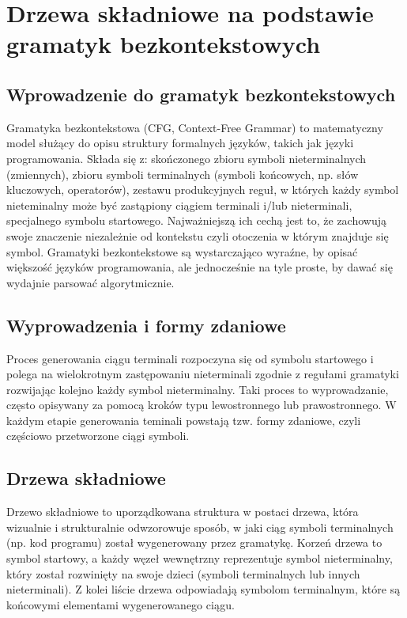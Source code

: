 \documentclass[12pt,twoside]{article}
\begin{document}
\clearpage

\section{Drzewa składniowe na podstawie gramatyk bezkontekstowych}
\subsection{Wprowadzenie do gramatyk bezkontekstowych}
Gramatyka bezkontekstowa (CFG, Context-Free Grammar) to matematyczny model służący do opisu struktury formalnych języków, takich jak języki programowania. Składa się z: skończonego zbioru symboli nieterminalnych (zmiennych), zbioru symboli terminalnych (symboli końcowych, np. słów kluczowych, operatorów), zestawu produkcyjnych reguł, w których każdy symbol nieteminalny może być zastąpiony ciągiem terminali i/lub nieterminali, specjalnego symbolu startowego. Najważniejszą ich cechą jest to, że zachowują swoje znaczenie niezależnie od kontekstu czyli otoczenia w którym znajduje się symbol. Gramatyki bezkontekstowe są wystarczająco wyraźne, by opisać większość języków programowania, ale jednocześnie na tyle proste, by dawać się wydajnie parsować algorytmicznie.\cite{contextFreeGrammar}

\subsection{Wyprowadzenia i formy zdaniowe}
Proces generowania ciągu terminali rozpoczyna się od symbolu startowego i polega na wielokrotnym zastępowaniu nieterminali zgodnie z regułami gramatyki rozwijając kolejno każdy symbol nieterminalny\cite{contextFreeGrammar}. Taki proces to wyprowadzanie, często opisywany za pomocą kroków typu lewostronnego lub prawostronnego. W każdym etapie generowania teminali powstają tzw. formy zdaniowe, czyli częściowo przetworzone ciągi symboli.

\subsection{Drzewa składniowe}
Drzewo składniowe to uporządkowana struktura w postaci drzewa, która wizualnie i strukturalnie odwzorowuje sposób, w jaki ciąg symboli terminalnych (np. kod programu) został wygenerowany przez gramatykę. Korzeń drzewa to symbol startowy, a każdy węzeł wewnętrzny reprezentuje symbol nieterminalny, który został rozwinięty na swoje dzieci (symboli terminalnych lub innych nieterminali). Z kolei liście drzewa odpowiadają symbolom terminalnym, które są końcowymi elementami wygenerowanego ciągu.
\end{document}
